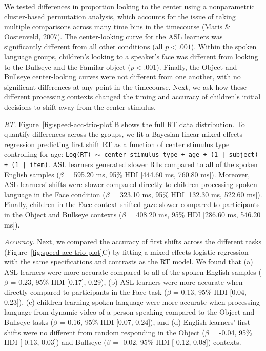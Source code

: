 \documentclass[english,floatsintext,man]{apa6}
\begin{document}
We tested differences in proportion looking to the center using a
nonparametric cluster-based permutation analysis, which accounts for the
issue of taking multiple comparisons across many time bins in the
timecourse (Maris \& Oostenveld, 2007). The center-looking curve for the
ASL learners was significantly different from all other conditions (all
\(p < .001\)). Within the spoken language groups, children's looking to
a speaker's face was different from looking to the Bullseye and the
Familar object (\(p < .001\)). Finally, the Object and Bullseye
center-looking curves were not different from one another, with no
significant differences at any point in the timecourse. Next, we ask how
these different processing contexts changed the timing and accuracy of
children's initial decisions to shift away from the center stimulus.

\emph{RT.} Figure~\ref{fig:speed-acc-trio-plot}B shows the full RT data
distribution. To quantify differences across the groups, we fit a
Bayesian linear mixed-effects regression predicting first shift RT as a
function of center stimulus type controlling for age:
\texttt{Log(RT) $\sim$ center stimulus type + age +  (1 | subject) + (1 | item)}.
ASL learners generated slower RTs compared to all of the spoken English
samples (\(\beta\) = 595.20 ms, 95\% HDI {[}444.60 ms, 760.80 ms{]}).
Moreover, ASL learners' shifts were slower compared directly to children
processing spoken language in the Face condition (\(\beta\) = 323.10 ms,
95\% HDI {[}132.30 ms, 522.60 ms{]}). Finally, children in the Face
context shifted gaze slower compared to participants in the Object and
Bullseye contexts (\(\beta\) = 408.20 ms, 95\% HDI {[}286.60 ms, 546.20
ms{]}).

\emph{Accuracy.} Next, we compared the accuracy of first shifts across
the different tasks (Figure~\ref{fig:speed-acc-trio-plot}C) by fitting a
mixed-effects logistic regression with the same specifications and
contrasts as the RT model. We found that (a) ASL learners were more
accurate compared to all of the spoken English samples (\(\beta\) =
0.23, 95\% HDI {[}0.17{]}, 0.29), (b) ASL learners were more accurate
when directly compared to participants in the Face task (\(\beta\) =
0.13, 95\% HDI {[}0.04, 0.23{]}), (c) children learning spoken language
were more accurate when processing language from dynamic video of a
person speaking compared to the Object and Bullseye tasks (\(\beta\) =
0.16, 95\% HDI {[}0.07, 0.24{]}), and (d) English-learners' first shifts
were no different from random responding in the Object (\(\beta\) =
-0.04, 95\% HDI {[}-0.13, 0.03{]}) and Bullseye (\(\beta\) = -0.02, 95\%
HDI {[}-0.12, 0.08{]}) contexts.
\end{document}
